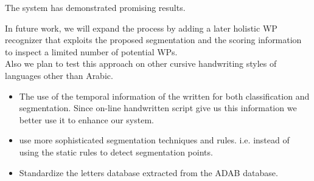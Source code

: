 The system has demonstrated promising results.

In future work, we will expand the process by adding a later holistic WP recognizer that exploits the proposed segmentation and the scoring information to inspect a limited number of potential WPs.\\

Also we plan to test this approach on other cursive handwriting styles of languages other than Arabic. 

\begin{itemize}
\item The use of the temporal information of the written for both classification and segmentation. Since on-line handwritten script give us this information we better use it to enhance our system. 
\item use more sophisticated segmentation techniques and rules. i.e. instead of using the static rules to detect segmentation points.   
\item Standardize the letters database extracted from the ADAB database.
\end{itemize}


%
